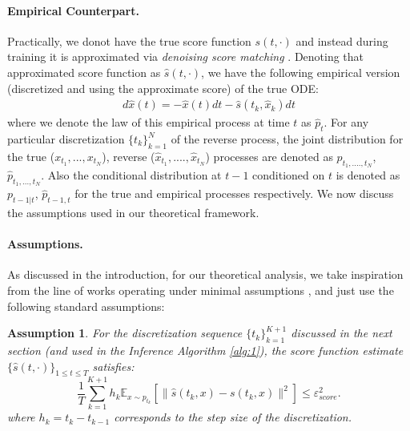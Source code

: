\documentclass{article}
\newtheorem{assumption}{Assumption}[section]
\begin{document}
\paragraph{Empirical Counterpart.} Practically, we donot have the true score function $s(t,\cdot)$ and instead during training it is approximated via \textit{denoising score matching} \cite{song2020denoising}. Denoting that approximated score function as $\hat{s}(t,\cdot)$, we have the following empirical version (discretized and using the approximate score) of the true ODE:
\begin{align}
\label{discretized_em_ode}
 d\hat{x}(t) = -\hat{x}(t) dt -\hat{s}({t_k},\hat{x}_{k})dt
\end{align}
where we denote the law of this empirical process at time $t$ as $\hat{p}_t$. For any particular discretization $\{t_k\}^N_{k=1}$ of the reverse process, the joint distribution for  the true ($x_{t_1},...,x_{t_N}$), reverse ($\hat{x}_{t_1},....,\hat{x}_{t_N}$) processes are denoted as $p_{t_1,...., t_N}$, $\hat{p}_{t_1,...,t_N}$. Also the conditional distribution at $t-1$ conditioned on $t$ is denoted as $p_{t-1|t}$, $\hat{p}_{t-1,t}$ for the true and empirical processes respectively. 
We now discuss the assumptions used in our theoretical framework. \\


\paragraph{Assumptions.} As discussed in the introduction, for our theoretical analysis, we take inspiration from the line of works operating under minimal assumptions \cite{benton2023nearly, chen2023improved, li2024d}, and just use the following standard assumptions: 
\begin{assumption}
\label{assumption_score_est}
    \textit{For the discretization sequence $\{t_{k}\}^{K+1}_{k=1}$ discussed in the next section (and used in the Inference Algorithm \ref{alg:1}), the score function estimate} $\{\hat{s}(t,\cdot)\}_{1\leq t \leq T}$ satisfies:
    \begin{equation}
    \label{eq_score_est}
     \frac{1}{T}\sum_{k=1}^{K+1}h_k\mathbb{E}_{x \sim p_{t_k}}\left [\|\hat{s}(t_k,x)- s(t_k,x)\|^2 \right ] \leq \varepsilon^2_{score}.
\end{equation}
where $h_k=t_{k}-t_{k-1}$ corresponds to the step size of the discretization.

\end{assumption}
\end{document}
